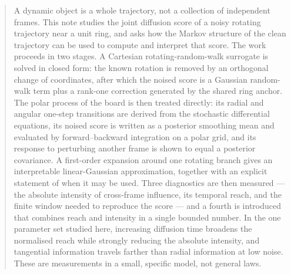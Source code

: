 \documentclass[11pt,a4paper]{article}
\begin{document}
\begin{abstract}
\noindent
A dynamic object is a whole trajectory, not a collection of independent frames. This note
studies the joint diffusion score of a noisy rotating trajectory near a unit ring, and asks
how the Markov structure of the clean trajectory can be used to compute and interpret that
score. The work proceeds in two stages. A Cartesian rotating-random-walk surrogate is solved
in closed form: the known rotation is removed by an orthogonal change of coordinates, after
which the noised score is a Gaussian random-walk term plus a rank-one correction generated by
the shared ring anchor. The polar process of the board is then treated directly: its radial
and angular one-step transitions are derived from the stochastic differential equations, its
noised score is written as a posterior smoothing mean and evaluated by forward--backward
integration on a polar grid, and its response to perturbing another frame is shown to equal a
posterior covariance. A first-order expansion around one rotating branch gives an
interpretable linear-Gaussian approximation, together with an explicit statement of when it
may be used. Three diagnostics are then measured --- the absolute intensity of cross-frame
influence, its temporal reach, and the finite window needed to reproduce the score --- and a
fourth is introduced that combines reach and intensity in a single bounded number. In the one
parameter set studied here, increasing diffusion time broadens the normalised reach while
strongly reducing the absolute intensity, and tangential information travels farther than
radial information at low noise. These are measurements in a small, specific model, not
general laws.
\end{abstract}
\end{document}
